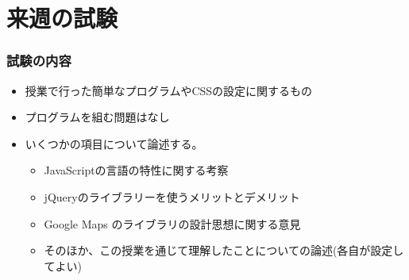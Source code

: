 \documentclass[dvipsk]{beamer}
\begin{document}
\section{来週の試験}
\begin{frame}[containsverbatim]
 \frametitle{試験の内容}
 \begin{itemize}
  \item 授業で行った簡単なプログラムやCSSの設定に関するもの
  \item プログラムを組む問題はなし
  \item いくつかの項目について論述する。
\begin{itemize}
 \item JavaScriptの言語の特性に関する考察
 \item jQueryのライブラリーを使うメリットとデメリット
 \item Google Maps のライブラリの設計思想に関する意見
 \item そのほか、この授業を通じて理解したことについての論述(各自が設定し
       てよい)
\end{itemize}
 \end{itemize}
 \end{frame}
\end{document}

